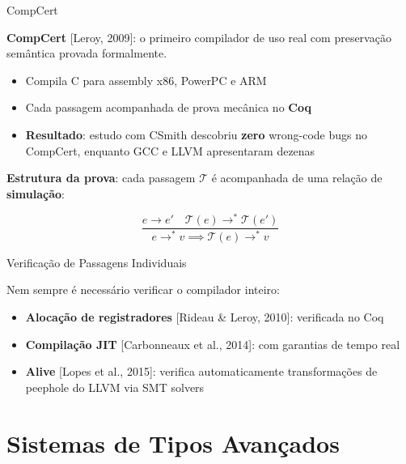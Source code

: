 \begin{frame}{CompCert}

    \textbf{CompCert} {[}Leroy, 2009{]}: o primeiro compilador de uso real
    com preservação semântica provada formalmente.

    \begin{itemize}

        \item
        Compila C para assembly x86, PowerPC e ARM
        \item
        Cada passagem acompanhada de prova mecânica no \textbf{Coq}
        \item
        \textbf{Resultado}: estudo com CSmith descobriu \textbf{zero}
        wrong-code bugs no CompCert, enquanto GCC e LLVM apresentaram dezenas
    \end{itemize}

    \textbf{Estrutura da prova}: cada passagem \(\mathcal{T}\) é acompanhada
    de uma relação de \textbf{simulação}:

    \[\frac{e \to e' \quad \mathcal{T}(e) \to^* \mathcal{T}(e')}{e \to^* v \implies \mathcal{T}(e) \to^* v}\]
\end{frame}

\begin{frame}{Verificação de Passagens Individuais}

    Nem sempre é necessário verificar o compilador inteiro:

    \begin{itemize}

        \item
        \textbf{Alocação de registradores} {[}Rideau \& Leroy, 2010{]}:
        verificada no Coq
        \item
        \textbf{Compilação JIT} {[}Carbonneaux et al., 2014{]}: com garantias
        de tempo real
        \item
        \textbf{Alive} {[}Lopes et al., 2015{]}: verifica automaticamente
        transformações de peephole do LLVM via SMT solvers
    \end{itemize}
\end{frame}


\section{Sistemas de Tipos
Avançados}\label{sistemas-de-tipos-avanuxe7ados}

